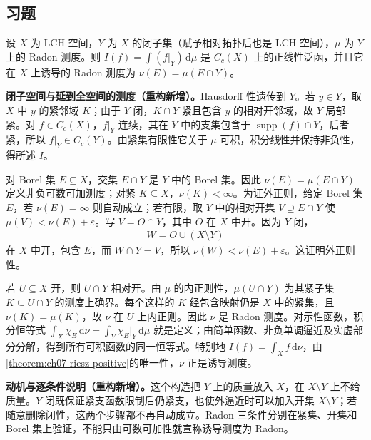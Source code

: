 \documentclass[../../main.tex]{subfiles}
\begin{document}
\subsection*{习题}
\begin{exercise}\label{exercise:ch07-closed-subspace-measure}
设 $X$ 为 LCH 空间，$Y$ 为 $X$ 的闭子集（赋予相对拓扑后也是 LCH 空间），$\mu$ 为 $Y$ 上的 Radon 测度。则 $I(f)=\int(f|_Y)\,\mathrm d\mu$ 是 $C_c(X)$ 上的正线性泛函，并且它在 $X$ 上诱导的 Radon 测度为 $\nu(E)=\mu(E\cap Y)$。
\end{exercise}
\begin{solution}
\textbf{闭子空间与延到全空间的测度（重构新增）。}Hausdorff 性遗传到 $Y$。若 $y\in Y$，取 $X$ 中 $y$ 的紧邻域 $K$；由于 $Y$ 闭，$K\cap Y$ 紧且包含 $y$ 的相对开邻域，故 $Y$ 局部紧。对 $f\in C_c(X)$，$f|_Y$ 连续，其在 $Y$ 中的支集包含于 $\operatorname{supp}(f)\cap Y$，后者紧，所以 $f|_Y\in C_c(Y)$。由紧集有限性它关于 $\mu$ 可积，积分线性并保持非负性，得所述 $I$。

对 Borel 集 $E\subseteq X$，交集 $E\cap Y$ 是 $Y$ 中的 Borel 集。因此 $\nu(E)=\mu(E\cap Y)$ 定义非负可数可加测度；对紧 $K\subseteq X$，$\nu(K)<\infty$。为证外正则，给定 Borel 集 $E$，若 $\nu(E)=\infty$ 则自动成立；若有限，取 $Y$ 中的相对开集 $V\supseteq E\cap Y$ 使 $\mu(V)<\nu(E)+\varepsilon$。写 $V=O\cap Y$，其中 $O$ 在 $X$ 中开。因为 $Y$ 闭，
\begin{align*}
W=O\cup(X\setminus Y)
\end{align*}
在 $X$ 中开，包含 $E$，而 $W\cap Y=V$，所以 $\nu(W)<\nu(E)+\varepsilon$。这证明外正则性。

若 $U\subseteq X$ 开，则 $U\cap Y$ 相对开。由 $\mu$ 的内正则性，$\mu(U\cap Y)$ 为其紧子集 $K\subseteq U\cap Y$ 的测度上确界。每个这样的 $K$ 经包含映射仍是 $X$ 中的紧集，且 $\nu(K)=\mu(K)$，故 $\nu$ 在 $U$ 上内正则。因此 $\nu$ 是 Radon 测度。对示性函数，积分恒等式 $\int_X\chi_E\,\mathrm d\nu=\int_Y\chi_E|_Y\,\mathrm d\mu$ 就是定义；由简单函数、非负单调逼近及实虚部分分解，得到所有可积函数的同一恒等式。特别地 $I(f)=\int_Xf\,\mathrm d\nu$，由\cref{theorem:ch07-riesz-positive}的唯一性，$\nu$ 正是诱导测度。
\end{solution}
\begin{remark}
\textbf{动机与逐条件说明（重构新增）。}这个构造把 $Y$ 上的质量放入 $X$，在 $X\setminus Y$ 上不给质量。$Y$ 闭既保证紧支函数限制后仍紧支，也使外逼近时可以加入开集 $X\setminus Y$；若随意删除闭性，这两个步骤都不再自动成立。Radon 三条件分别在紧集、开集和 Borel 集上验证，不能只由可数可加性就宣称诱导测度为 Radon。
\end{remark}
\end{document}
